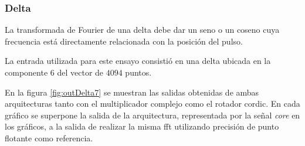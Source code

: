 \subsubsection{Delta}

La transformada de Fourier de una delta debe dar un seno o un coseno cuya frecuencia está
directamente relacionada con la posición del pulso.

La entrada utilizada para este ensayo consistió en
una delta ubicada en la componente $6$ del vector de $4094$ puntos.

En la figura \ref{fig:outDelta7} se muestran las salidas obtenidas de ambas arquitecturas tanto con
el multiplicador complejo como el rotador cordic. En cada gráfico se superpone la
salida de la arquitectura, representada por la señal \textit{core} en los gráficos, a la salida de
realizar la misma fft utilizando precisión de punto flotante como referencia.

